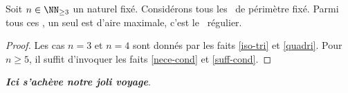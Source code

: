 \begin{fact}
    Soit $n \in \NN_{\geq3}$ un naturel fixé.
    Considérons tous les \ngones\  de périmètre fixé. Parmi tous ces \ngones, un seul est d'aire maximale, c'est le \ngone\ régulier.
\end{fact}


\begin{proof}
	Les cas $n = 3$ et $n = 4$ sont donnés par les faits \ref{iso-tri} et \ref{quadri}.
	Pour $n \geq 5 $, il suffit d'invoquer les faits \ref{nece-cond} et \ref{suff-cond}.
\end{proof}

\bigskip
\hfill {\small\itshape\bfseries Ici s'achève notre joli voyage}.